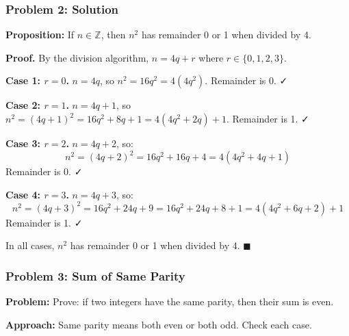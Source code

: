 \documentclass{beamer}
\begin{document}
\begin{frame}
  \frametitle{Problem 2: Solution}

  {\color{darkmaroon}\textbf{Proposition:}} If $n \in \mathbb{Z}$, then $n^2$ has remainder 0 or 1 when divided by 4.

  \vspace{0.2cm}
  {\color{darkmaroon}\textbf{Proof.}} By the division algorithm, $n = 4q + r$ where $r \in \{0, 1, 2, 3\}$.

  \vspace{0.2cm}
  \textbf{Case 1: $r = 0$.} $n = 4q$, so $n^2 = 16q^2 = 4(4q^2)$. Remainder is 0. ✓

  \textbf{Case 2: $r = 1$.} $n = 4q + 1$, so $n^2 = (4q+1)^2 = 16q^2 + 8q + 1 = 4(4q^2+2q) + 1$. Remainder is 1. ✓

  \textbf{Case 3: $r = 2$.} $n = 4q + 2$, so:
  $$n^2 = (4q+2)^2 = 16q^2 + 16q + 4 = 4(4q^2 + 4q + 1)$$
  Remainder is 0. ✓

  \textbf{Case 4: $r = 3$.} $n = 4q + 3$, so:
  $$n^2 = (4q+3)^2 = 16q^2 + 24q + 9 = 16q^2 + 24q + 8 + 1 = 4(4q^2+6q+2) + 1$$
  Remainder is 1. ✓

  In all cases, $n^2$ has remainder 0 or 1 when divided by 4. \hfill $\blacksquare$
\end{frame}

\begin{frame}
  \frametitle{Problem 3: Sum of Same Parity}

  {\color{maroon}\textbf{Problem:}} Prove: if two integers have the same parity, then their sum is even.

  \vspace{0.3cm}
  {\color{maroon}\textbf{Approach:}} Same parity means both even or both odd. Check each case.
\end{frame}
\end{document}
